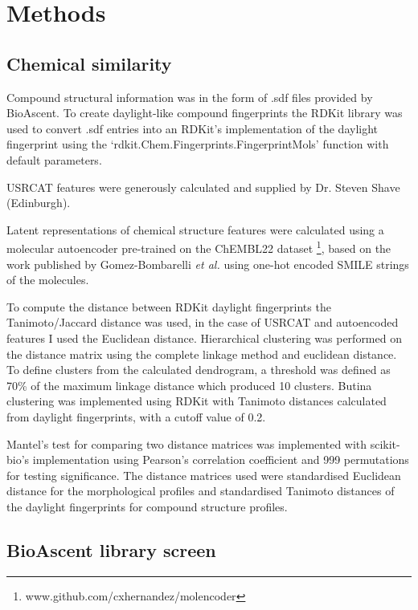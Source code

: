 \documentclass[a4paper,11pt,twoside,openright]{scrbook}
\begin{document}
\section{Methods}

\subsection{Chemical similarity}
Compound structural information was in the form of .sdf files provided by BioAscent.
To create daylight-like compound fingerprints the RDKit library was used to convert .sdf entries into an RDKit's implementation of the daylight fingerprint using the `rdkit.Chem.Fingerprints.FingerprintMols' function with default parameters.

USRCAT features were generously calculated and supplied by Dr. Steven Shave (Edinburgh).

Latent representations of chemical structure features were calculated using a molecular autoencoder pre-trained on the ChEMBL22 dataset \footnote{www.github.com/cxhernandez/molencoder}, based on the work published by Gomez-Bombarelli \textit{et al.} \cite{Gomez-Bombarelli2016} using one-hot encoded SMILE strings of the molecules.

To compute the distance between RDKit daylight fingerprints the Tanimoto/Jaccard distance was used, in the case of USRCAT and autoencoded features I used the Euclidean distance.
Hierarchical clustering was performed on the distance matrix using the complete linkage method and euclidean distance.
To define clusters from the calculated dendrogram, a threshold was defined as 70\% of the maximum linkage distance which produced 10 clusters.
Butina clustering was implemented using RDKit with Tanimoto distances calculated from daylight fingerprints, with a cutoff value of 0.2.

Mantel's test for comparing two distance matrices was implemented with scikit-bio's implementation using Pearson's correlation coefficient and 999 permutations for testing significance.
The distance matrices used were standardised Euclidean distance for the morphological profiles and standardised Tanimoto distances of the daylight fingerprints for compound structure profiles.


\subsection{BioAscent library screen}
\end{document}
